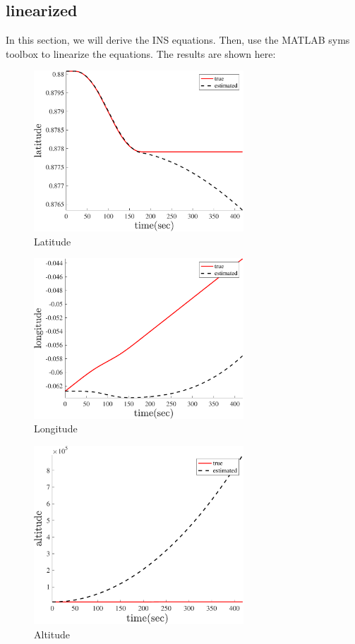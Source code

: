 \subsection{linearized}
In this section, we will derive the INS equations. Then, use the MATLAB syms toolbox to linearize the equations. The results are shown here:
\begin{figure}[H]
    \centering
    \includegraphics[width=0.7\textwidth]{../Figure/Q5/latitude_lin}
    \caption{Latitude}
\end{figure}
\begin{figure}[H]
    \centering
    \includegraphics[width=0.7\textwidth]{../Figure/Q5/longitude_lin}
    \caption{Longitude}
\end{figure}
\begin{figure}[H]
    \centering
    \includegraphics[width=0.7\textwidth]{../Figure/Q5/altitude_lin}
    \caption{Altitude}
\end{figure}
